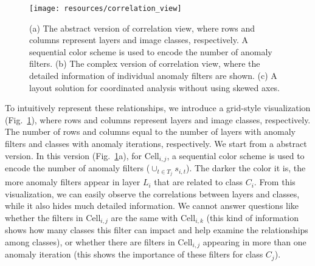 \documentclass[format=acmsmall, review=false, screen=true]{acmart}
\newcommand{\ti}{\textcolor[rgb]{0,0,0}}
\begin{document}
\begin{figure}[t]
	\centering
	\texttt{[image: resources/correlation\_view]}
	\caption{ (a) The abstract version of correlation view, where rows and columns represent layers and image classes, respectively. A sequential color scheme is used to encode the number of anomaly filters. (b) The complex version of correlation view, where the detailed information of individual anomaly filters are shown. (c) A layout solution for coordinated analysis without using skewed axes. }
	\label{fig:correlation_view}
\end{figure}%
To intuitively represent these relationships, we introduce a grid-style visualization (Fig.~\ref{fig:correlation_view}), where rows and columns represent layers and image classes, respectively. The number of rows and columns equal to the number of layers with anomaly filters and classes with anomaly iterations, respectively.
\ti{
We start from a abstract version.
In this version (Fig.~\ref{fig:correlation_view}a), for $\mathrm{Cell}_{i,j}$, a sequential color scheme is used to encode the number of anomaly filters ($\cup_{t\in T_j}s_{i,t}$).
The darker the color it is, the more anomaly filters appear in layer $L_i$ that are related to class $C_i$.
From this visualization, we can easily observe the correlations between layers and classes, while it also hides much detailed information.
We cannot answer questions like whether the filters in $\mathrm{Cell}_{i,j}$ are the same with $\mathrm{Cell}_{i,k}$ (this kind of information shows how many classes this filter can impact and help examine the relationships among classes), or whether there are filters in $\mathrm{Cell}_{i,j}$ appearing in more than one anomaly iteration (this shows the importance of these filters for class $C_j$).
}
\end{document}
